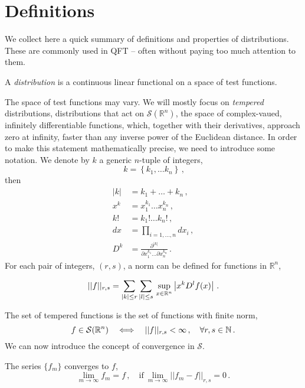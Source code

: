 \section{Definitions}
\label{sec:distr-defs}

We collect here a quick summary of definitions and properties of distributions.
These are commonly used in QFT -- often without paying too much attention to
them. 

\begin{Def}
    A {\em distribution} is a continuous linear functional on a space of 
    test functions. 
\end{Def}
The space of test functions may vary. We will mostly focus on {\em tempered}
distributions, \ie distributions that act on
$\mathcal{S}\left(\mathbb{R}^n\right)$, the space of complex-vaued, infinitely
differentiable functions, which, together with their derivatives, approach zero
at infinity, faster than any inverse power of the Euclidean distance. In order
to make this statement mathematically precise, we need to introduce some
notation. We denote by $k$ a generic $n$-tuple of integers, 
\begin{equation}
    \label{eq:MultiIndexDef}\
    k = \left\{ k_1, \ldots k_n\right\}\, ,
\end{equation}
then 
\begin{align}
    \label{eq:modk-def}
    |k| &= k_1 + \ldots + k_n\, , \\
    \label{eq:x-power-k}
    x^k &= x_1^{k_1} \ldots x_n^{k_n}\, , \\
    \label{eq:factk-def}
    k! &= k_1! \ldots k_n!\, , \\
    \label{eq:dx-def}
    dx &= \prod_{i=1, \ldots, n} dx_i\, , \\
    \label{eq:derivs}
    D^k &= \frac{\partial^{|k|}}{\partial x_1^{k_1} \ldots \partial x_n^{k_n}}\, .
\end{align}
For each pair of integers, $(r,s)$, a norm can be defined for functions in
$\mathbb{R}^n$,
\begin{Def}
    \[
    ||f||_{r,s} = \sum_{|k|\leq r} \sum_{|l|\leq s} \, 
    \sup_{x\in \mathbb{R}^n} \left| x^k D^l f(x)\right| \, .
    \]
\end{Def}
The set of tempered functions is the set of functions with finite norm, 
\[
    f \in \mathcal{S}(\mathbb{R}^n) \quad 
    \Longleftrightarrow \quad
    ||f||_{r,s} < \infty\, , \quad \forall r,s \in \mathbb{N}\, .    
\]
We can now introduce the concept of convergence in $\mathcal{S}$.
\begin{Def}
    The series $\{f_m\}$ converges to $f$, 
    \[
        \lim_{m\to\infty} f_m = f\, , \quad \mathrm{if} \ 
        \lim_{m\to\infty} ||f_m -f||_{r,s} = 0 \, .
    \] 
\end{Def}
